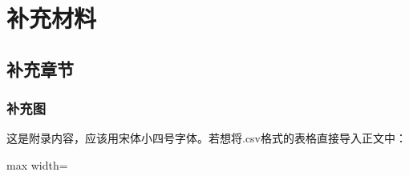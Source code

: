 
\chapter{补充材料}


\section{补充章节}

\subsection{补充图}

这是附录内容，应该用宋体小四号字体。若想将.csv格式的表格直接导入正文中：

\begin{table}
	\centering
	\caption{从csv文件中导入表格}
	\begin{adjustbox}{max width=\linewidth}
	\end{adjustbox}
	\label{tab:asterid}
\end{table}




